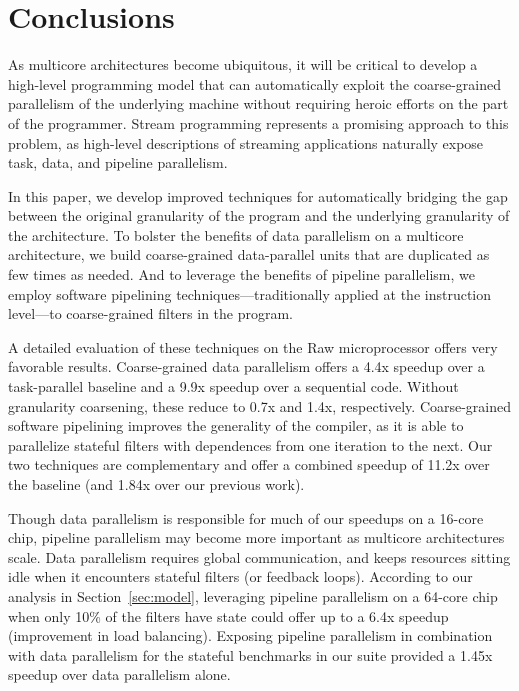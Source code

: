 \section{Conclusions}

As multicore architectures become ubiquitous, it will be critical to
develop a high-level programming model that can automatically exploit
the coarse-grained parallelism of the underlying machine without
requiring heroic efforts on the part of the programmer.  Stream
programming represents a promising approach to this problem, as
high-level descriptions of streaming applications naturally expose
task, data, and pipeline parallelism.  

In this paper, we develop improved techniques for automatically
bridging the gap between the original granularity of the program and
the underlying granularity of the architecture.  To bolster the
benefits of data parallelism on a multicore architecture, we build
coarse-grained data-parallel units that are duplicated as few times as
needed.  And to leverage the benefits of pipeline parallelism, we
employ software pipelining techniques---traditionally applied at the
instruction level---to coarse-grained filters in the program.

A detailed evaluation of these techniques on the Raw microprocessor
offers very favorable results.  Coarse-grained data parallelism offers
a 4.4x speedup over a task-parallel baseline and a 9.9x speedup over a
sequential code.  Without granularity coarsening, these reduce to 0.7x
and 1.4x, respectively.  Coarse-grained software pipelining improves
the generality of the compiler, as it is able to parallelize stateful
filters with dependences from one iteration to the next.  Our two
techniques are complementary and offer a combined speedup of 11.2x
over the baseline (and 1.84x over our previous work).

Though data parallelism is responsible for much of our speedups on a
16-core chip, pipeline parallelism may become more important as
multicore architectures scale.  Data parallelism requires global
communication, and keeps resources sitting idle when it encounters
stateful filters (or feedback loops).  According to our analysis in
Section~\ref{sec:model}, leveraging pipeline parallelism on a 64-core
chip when only 10\% of the filters have state could offer up to a 6.4x
speedup (improvement in load balancing).  Exposing pipeline
parallelism in combination with data parallelism for the stateful
benchmarks in our suite provided a 1.45x speedup over data
parallelism alone.

